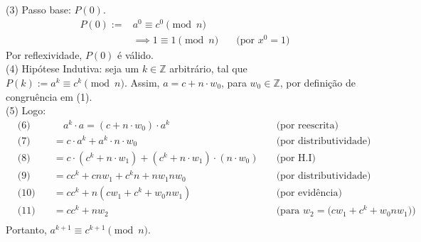 \begin{enumerate}
		(3) Passo base: $P(0)$.
			\begin{align*}
				P(0) :=& a^0 \equiv c^0 \pmod{n} \\
				&\implies 1 \equiv 1 \pmod{n} &\quad \text{(por $x^0 = 1$)}
			\end{align*}
		Por reflexividade, $P(0)$ é válido. \\
		(4) Hipótese Indutiva: seja um $k \in \mathbb{Z}$ arbitrário, tal que $P(k):= a^k \equiv c^k \pmod{n}$. Assim, $a = c + n \cdot w_0$, para $w_0 \in \mathbb{Z}$, por definição de congruência em (1). \\
		(5) Logo: 
		\begin{align*}
			&\text{(6)} &\quad a^k \cdot a = (c + n \cdot w_0) \cdot a^k &\quad \text{(por reescrita)} \\ 
			&\text{(7)} \quad &= c \cdot a^k + a^k \cdot n \cdot w_0 &\quad \text{(por distributividade)} \\
			&\text{(8)} \quad &= c \cdot (c^k + n \cdot w_1) + (c^k + n \cdot w_1) \cdot (n \cdot w_0) &\quad \text{(por H.I)} \\
			&\text{(9)} \quad &= cc^k + cnw_1 + c^kn + nw_1nw_0 &\quad \text{(por distributividade)} \\
			&\text{(10)} \quad &= cc^k + n(cw_1 + c^k + w_0nw_1) &\quad \text{(por evidência)} \\
			&\text{(11)} \quad &= cc^k + nw_2 &\quad \text{(para $w_2 = (cw_1 + c^k + w_0nw_1$))} \\
		\end{align*}
		Portanto, $a^{k+1} \equiv c^{k+1} \pmod{n}$.
\end{enumerate}


